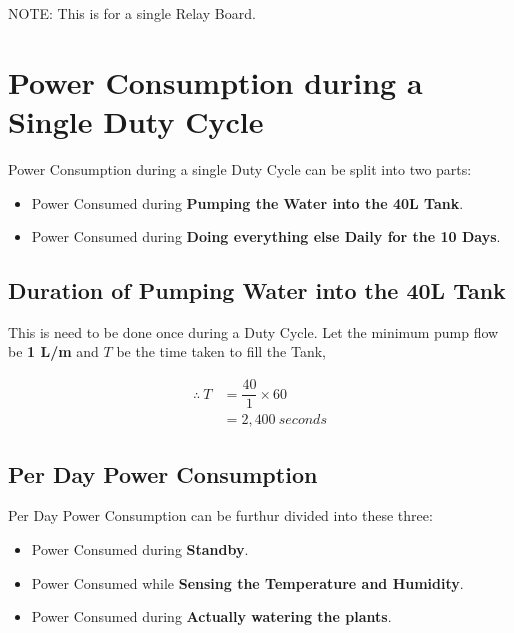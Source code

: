 \documentclass[../main.tex]{subfiles}
\begin{document}
NOTE: This is for a single Relay Board.

\section{Power Consumption during a Single Duty Cycle}

Power Consumption during a single Duty Cycle can be split into two parts:

\begin{itemize}
    \item Power Consumed during \textbf{Pumping the Water into the 40L Tank}.
    \item Power Consumed during \textbf{Doing everything else Daily for the 10 Days}.
\end{itemize}

\begin{figure}[h!]
    \centering
\end{figure}

\subsection{Duration of Pumping Water into the 40L Tank}

This is need to be done once during a Duty Cycle.
Let the minimum pump flow be \textbf{1 L/m} and $T$ be the time taken to fill the Tank,

\begin{align*}
    \therefore \: T &= \dfrac{40}{1} \times 60 \\
    & = 2,400 \: seconds
\end{align*}

\subsection{Per Day Power Consumption}

Per Day Power Consumption can be furthur divided into these three:

\begin{itemize}
    \item Power Consumed during \textbf{Standby}.
    \item Power Consumed while \textbf{Sensing the Temperature and Humidity}.
    \item Power Consumed during \textbf{Actually watering the plants}.
\end{itemize}
\end{document}
